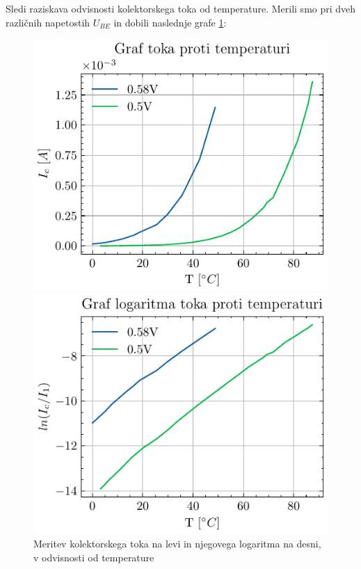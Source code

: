 \documentclass[12pt]{article}
\begin{document}
\bigskip

\noindent Sledi raziskava odvisnosti kolektorskega toka od temperature. Merili smo pri dveh različnih napetostih $U_{BE}$ in dobili naslednje grafe \ref{iodt}:

\begin{figure}[h!]
\centering
\begin{minipage}[t]{0.45\textwidth}
    \includegraphics[width=\textwidth]{iodt.pdf}

\end{minipage}
\hfill
\begin{minipage}[t]{0.45\textwidth}
    \includegraphics[width=\textwidth]{lniodt.pdf}

\end{minipage}
\caption{Meritev kolektorskega toka na levi in njegovega logaritma na desni, v odvisnosti od temperature}
\label{iodt}
\end{figure}
\end{document}
